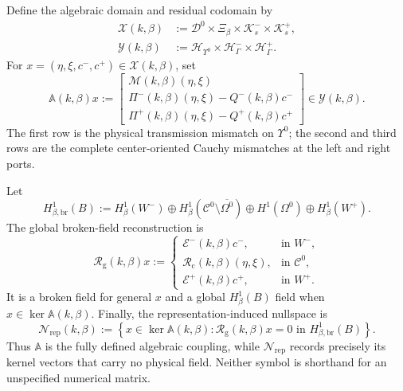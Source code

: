 \begin{definition}
\label{def:coupled-operator}
Define the algebraic domain and residual codomain by
\begin{align}
  \mathcal X(k,\beta)
  &:=\mathcal D^0\times\Xi_\beta\times
  \mathcal K_s^-\times\mathcal K_s^+,
  \label{eq:coupled-domain}\\
  \mathcal Y(k,\beta)
  &:=\mathcal H_{\Upsilon^0}\times
  \mathcal H_\Gamma^-\times\mathcal H_\Gamma^+.
  \label{eq:coupled-codomain}
\end{align}
For $x=(\eta,\xi,c^-,c^+)\in\mathcal X(k,\beta)$, set
\begin{equation}
  \mathbb A(k,\beta)x:=
  \begin{bmatrix}
  \mathcal M(k,\beta)(\eta,\xi)\\
  \Pi^-(k,\beta)(\eta,\xi)-Q^-(k,\beta)c^-\\
  \Pi^+(k,\beta)(\eta,\xi)-Q^+(k,\beta)c^+
  \end{bmatrix}
  \in\mathcal Y(k,\beta).
  \label{eq:coupled-operator}
\end{equation}
The first row is the physical transmission mismatch on $\Upsilon^0$; the second
and third rows are the complete center-oriented Cauchy mismatches at the left
and right ports.

Let
\begin{equation}
  H^1_{\beta,\mathrm{br}}(B):=
  H^1_\beta(W^- )\oplus
  H^1_\beta(\mathcal C^0\setminus\overline{\Omega^0})
  \oplus H^1(\Omega^0)
  \oplus H^1_\beta(W^+).
  \label{eq:global-broken-space}
\end{equation}
The global broken-field reconstruction is
\begin{equation}
  \mathcal R_{\mathrm g}(k,\beta)x:=
  \begin{cases}
    \mathcal E^-(k,\beta)c^-,&\text{in }W^-,\\
    \mathcal R_{\mathrm c}(k,\beta)(\eta,\xi),&\text{in }\mathcal C^0,\\
    \mathcal E^+(k,\beta)c^+,&\text{in }W^+.
  \end{cases}
  \label{eq:global-reconstruction}
\end{equation}
It is a broken field for general $x$ and a global $H^1_\beta(B)$ field when
$x\in\ker\mathbb A(k,\beta)$.  Finally, the representation-induced nullspace
is
\begin{equation}
  \mathcal N_{\mathrm{rep}}(k,\beta):=
  \left\{x\in\ker\mathbb A(k,\beta):
  \mathcal R_{\mathrm g}(k,\beta)x=0
  \text{ in }H^1_{\beta,\mathrm{br}}(B)\right\}.
  \label{eq:Nrep-definition}
\end{equation}
Thus $\mathbb A$ is the fully defined algebraic coupling, while
$\mathcal N_{\mathrm{rep}}$ records precisely its kernel vectors that carry no
physical field.  Neither symbol is shorthand for an unspecified numerical
matrix.
\end{definition}
